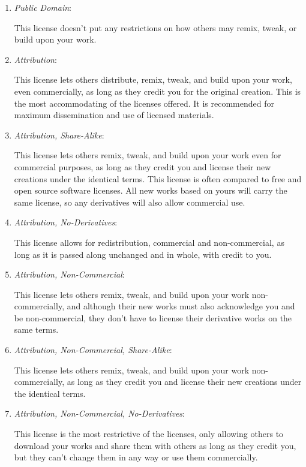\begin{enumerate}
  \item \emph{Public Domain}:

This license doesn't put any restrictions on how others may remix, tweak, or
build upon your work.

  \item \emph{Attribution}:

This license lets others distribute, remix, tweak, and build upon your work,
even commercially, as long as they credit you for the original creation. This
is the most accommodating of the licenses offered.  It is recommended for
maximum dissemination and use of licensed materials.

  \item \emph{Attribution, Share-Alike}:

This license lets others remix, tweak, and build upon your work even for
commercial purposes, as long as they credit you and license their new creations
under the identical terms.  This license is often compared to free and open
source software licenses.  All new works based on yours will carry the same
license, so any derivatives will also allow commercial use.

  \item \emph{Attribution, No-Derivatives}:

This license allows for redistribution, commercial and non-commercial, as long
as it is passed along unchanged and in whole, with credit to you.

  \item \emph{Attribution, Non-Commercial}:

This license lets others remix, tweak, and build upon your work
non-commercially, and although their new works must also acknowledge you and be
non-commercial, they don't have to license their derivative works on the same
terms.

  \item \emph{Attribution, Non-Commercial, Share-Alike}:

This license lets others remix, tweak, and build upon your work
non-commercially, as long as they credit you and license their new creations
under the identical terms.

  \item \emph{Attribution, Non-Commercial, No-Derivatives}:

This license is the most restrictive of the licenses, only allowing others to
download your works and share them with others as long as they credit you, but
they can't change them in any way or use them commercially.
\end{enumerate}

